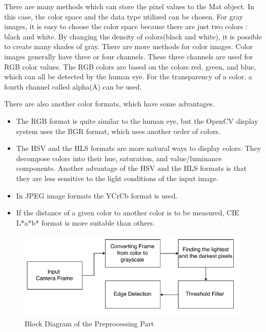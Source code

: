 There are many methods which can store the pixel values to the Mat object. In this case, the color space and the data type utilized can be chosen. For gray images, it is easy to choose the color space because there are just two colors : black and white. By changing the density of colors(black and white), it is possible to create many shades of gray. There are more methods for color images. Color images generally have three or four channels. These three channels are used for RGB color values. The RGB colors are based on the colors red, green, and blue, which can all be detected by the human eye. For the transparency of a color, a fourth channel called alpha(A) can be used.

There are also another color formats, which have some advantages\cite{OpenCV_Mat}. 

\begin{itemize}

\item The RGB format is quite similar to the human eye, but the OpenCV display system uses the BGR format, which uses another order of colors.

\item The HSV and the HLS formats are more natural ways to display colors. They decompose colors into their hue, saturation, and value/luminance components. Another advantage of the HSV and the HLS formats is that they are less sensitive to the light conditions of the input image.

\item In JPEG image formats the YCrCb format is used.

\item If the distance of a given color to another color is to be measured, CIE L*a*b* format is more suitable than others.

\end{itemize}




\begin{figure}[H]
 \centering
  \includegraphics[width=1\textwidth]{./Bilder/Presprocessing_Figure.png}	
  \caption{Block Diagram of the Preprocessing Part}
  \label{fig:Block_Diagram_of_the_Preprocessing_Part}
\end{figure}





